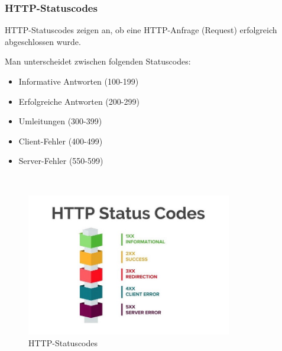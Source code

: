 \subsubsection{HTTP-Statuscodes}
HTTP-Statuscodes zeigen an, ob eine HTTP-Anfrage (Request) erfolgreich abgeschlossen wurde.

Man unterscheidet zwischen folgenden Statuscodes:
\begin{itemize}
  \item Informative Antworten (100-199)
  \item Erfolgreiche Antworten (200-299)
  \item Umleitungen (300-399)
  \item Client-Fehler (400-499)
  \item Server-Fehler (550-599)
\end{itemize}
~\cite{http_statuscode}

\begin{figure}[!htb]
  \includegraphics[width=0.8\textwidth]{pics/httpStatusCodes.jpeg}
  \centering
  \caption{HTTP-Statuscodes ~\cite{http_statuscode_pic}}
\end{figure}

